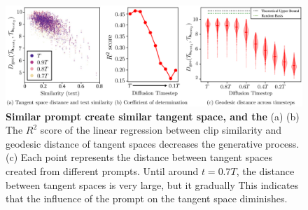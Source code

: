 \begin{figure}[!t]
    \centering
    \vspace{+1em}
    \includegraphics[width=0.9\linewidth]{figure/Homogenity_prompts.pdf}
    \caption{
    \textbf{Similar prompt create similar tangent space, and the } 
    (a)  
    (b) The $R^2$ score of the linear regression between clip similarity and geodesic distance of tangent spaces decreases  the generative process.
    (c) Each point represents the distance between tangent spaces created from different prompts. Until around $t = 0.7T$, the distance between tangent spaces is very large, but it gradually 
    This indicates that the influence of the prompt on the tangent space diminishes.
    }
    \label{fig:stable_text}
\end{figure}

